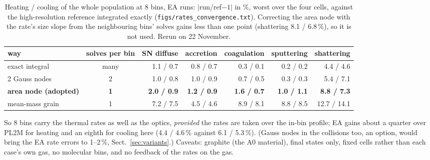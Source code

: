 \documentclass[11pt,a4paper]{article}
\begin{document}
\begin{table}[H]
\centering\small
\caption{Heating / cooling of the whole population at 8 bins, EA runs: $|$run/ref$-1|$ in \%, worst over the four
cells, against the high-resolution reference integrated exactly (\texttt{figs/rates\_convergence.txt}). Correcting
the area node with the rate's size slope from the neighbouring bins' solves gains less than one point (shattering
8.1 / 6.8\,\%), so it is not used. Rerun on 22 November.}\label{tab:areanode}
\begin{tabular}{@{}l c rrrrr@{}}
\toprule
way & solves per bin & SN diffuse & accretion & coagulation & sputtering & shattering \\
\midrule
exact integral & many & 1.1 / 0.7 & 0.8 / 0.7 & 0.3 / 0.1 & 0.2 / 0.2 & 4.4 / 4.6 \\
2 Gauss nodes & 2 & 1.0 / 0.8 & 1.0 / 0.9 & 0.7 / 0.5 & 0.3 / 0.3 & 5.4 / 7.1 \\
\textbf{area node (adopted)} & \textbf{1} & \textbf{2.0 / 0.9} & \textbf{1.2 / 0.9} & \textbf{1.6 / 0.7} &
  \textbf{1.0 / 1.1} & \textbf{8.8 / 7.3} \\
mean-mass grain & 1 & 7.2 / 7.5 & 4.5 / 4.6 & 8.9 / 8.1 & 8.8 / 8.5 & 12.7 / 14.1 \\
\bottomrule
\end{tabular}
\end{table}

So 8 bins carry the thermal rates as well as the optics, \emph{provided} the rates are taken over the in-bin profile;
EA gains about a quarter over PL2M for heating and an eighth for cooling here (4.4 / 4.6\,\% against 6.1 / 5.3\,\%). (Gauss nodes in the collisions too, an option, would
bring the EA rate errors to 1--2\,\%, Sect.~\ref{sec:variants}.)
Caveats: graphite (the A0 material), final states only, fixed cells rather than each case's own gas, no molecular bins,
and no feedback of the rates on the gas.
\end{document}
